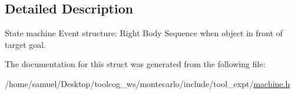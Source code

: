 \subsection{Detailed Description}
State machine Event structure\+: Right Body Sequence when object in front of target goal. 

The documentation for this struct was generated from the following file\+:\begin{DoxyCompactItemize}
\item 
/home/samuel/\+Desktop/toolcog\+\_\+ws/montecarlo/include/tool\+\_\+expt/\hyperlink{machine_8h}{machine.\+h}\end{DoxyCompactItemize}
